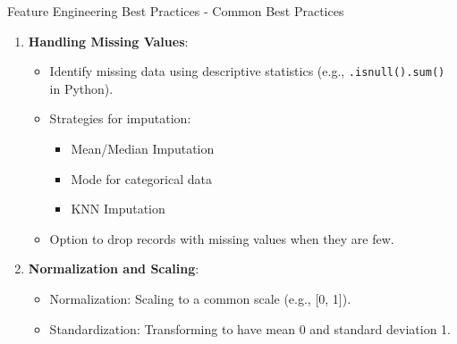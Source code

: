 \documentclass[aspectratio=169]{beamer}
\begin{document}
\begin{frame}[fragile]{Feature Engineering Best Practices - Common Best Practices}
    \begin{enumerate}
        \item \textbf{Handling Missing Values}:
            \begin{itemize}
                \item Identify missing data using descriptive statistics (e.g., \texttt{.isnull().sum()} in Python).
                \item Strategies for imputation:
                    \begin{itemize}
                        \item Mean/Median Imputation
                        \item Mode for categorical data
                        \item KNN Imputation
                    \end{itemize}
                \item Option to drop records with missing values when they are few.
            \end{itemize}
        
        \item \textbf{Normalization and Scaling}:
            \begin{itemize}
                \item Normalization: Scaling to a common scale (e.g., [0, 1]).
                \item Standardization: Transforming to have mean 0 and standard deviation 1.
            \end{itemize}
    \end{enumerate}
\end{frame}
\end{document}
